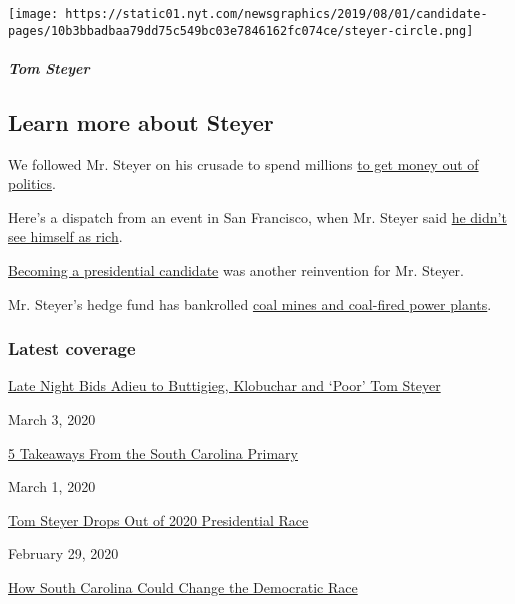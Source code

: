 \texttt{[image: https://static01.nyt.com/newsgraphics/2019/08/01/candidate-pages/10b3bbadbaa79dd75c549bc03e7846162fc074ce/steyer-circle.png]}

\hypertarget{tom-steyer-1}{%
\subparagraph{Tom Steyer}\label{tom-steyer-1}}

\hypertarget{learn-more-about-steyer}{%
\subsection{Learn more about Steyer}\label{learn-more-about-steyer}}

We followed Mr. Steyer on his crusade to spend millions
\href{https://www.nytimes.com/2019/08/27/us/politics/tom-steyer-debate.html}{to
get money out of politics}.

Here's a dispatch from an event in San Francisco, when Mr. Steyer said
\href{https://www.nytimes.com/2019/07/19/us/politics/tom-steyer-2020-campaign.html}{he
didn't see himself as rich}.

\href{https://www.nytimes.com/2019/07/09/us/politics/tom-steyer-president.html}{Becoming
a presidential candidate} was another reinvention for Mr. Steyer.

Mr. Steyer's hedge fund has bankrolled
\href{https://www.nytimes.com/2014/07/05/us/politics/prominent-environmentalist-helped-fund-coal-projects.html}{coal
mines and coal-fired power plants}.

\hypertarget{latest-coverage}{%
\subsubsection{Latest coverage}\label{latest-coverage}}

\href{https://www.nytimes.com/2020/03/03/arts/television/late-night-biden-buttigieg-klobuchar-steyer.html}{Late
Night Bids Adieu to Buttigieg, Klobuchar and `Poor' Tom Steyer}

March 3, 2020

\href{https://www.nytimes.com/2020/03/01/us/politics/sc-primary-biden.html}{5
Takeaways From the South Carolina Primary}

March 1, 2020

\href{https://www.nytimes.com/2020/02/29/us/politics/tom-steyer-drops-out.html}{Tom
Steyer Drops Out of 2020 Presidential Race}

February 29, 2020

\href{https://www.nytimes.com/2020/02/29/us/politics/black-voters-south-carolina-primary.html}{How
South Carolina Could Change the Democratic Race}

